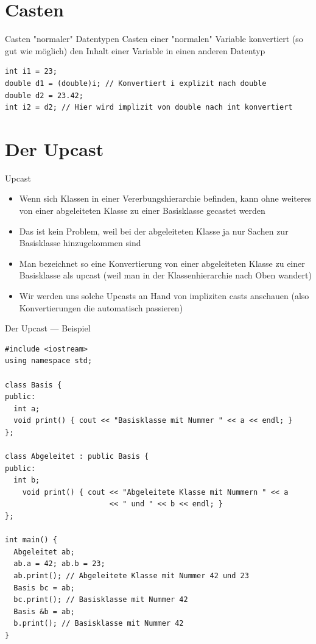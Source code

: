 \documentclass[presentation]{beamer}
\begin{document}
\section{Casten}
\label{sec:org47b2173}
\begin{frame}[fragile,label={sec:org2c69bd6}]{Casten "normaler" Datentypen}
 Casten einer "normalen" Variable konvertiert (so gut wie möglich) den
Inhalt einer Variable in einen anderen Datentyp
\begin{verbatim}
int i1 = 23;
double d1 = (double)i; // Konvertiert i explizit nach double
double d2 = 23.42;
int i2 = d2; // Hier wird implizit von double nach int konvertiert
\end{verbatim}
\end{frame}
\section{Der Upcast}
\label{sec:orgddf9222}
\begin{frame}[label={sec:org67d4d80}]{Upcast}
\begin{itemize}
\item Wenn sich Klassen in einer Vererbungshierarchie befinden, kann ohne
weiteres von einer abgeleiteten Klasse zu einer Basisklasse gecastet
werden
\item Das ist kein Problem, weil bei der abgeleiteten Klasse ja nur Sachen
zur Basisklasse hinzugekommen sind
\item Man bezeichnet so eine Konvertierung von einer abgeleiteten Klasse
zu einer Basisklasse als \alert{upcast} (weil man in der Klassenhierarchie
nach Oben wandert)
\item Wir werden uns solche Upcasts an Hand von impliziten casts anschauen
(also Konvertierungen die automatisch passieren)
\end{itemize}
\end{frame}
\begin{frame}[fragile,label={sec:orgf3867af}]{Der Upcast --- Beispiel}
 \begin{verbatim}
#include <iostream>
using namespace std;

class Basis {
public:
  int a;
  void print() { cout << "Basisklasse mit Nummer " << a << endl; }
};

class Abgeleitet : public Basis {
public:
  int b;
    void print() { cout << "Abgeleitete Klasse mit Nummern " << a
                        << " und " << b << endl; }
};

int main() {
  Abgeleitet ab;
  ab.a = 42; ab.b = 23;
  ab.print(); // Abgeleitete Klasse mit Nummer 42 und 23
  Basis bc = ab;
  bc.print(); // Basisklasse mit Nummer 42
  Basis &b = ab;
  b.print(); // Basisklasse mit Nummer 42
}
\end{verbatim}
\end{frame}
\end{document}
